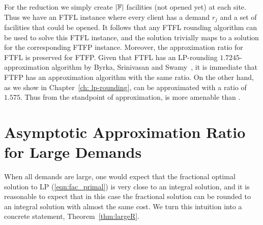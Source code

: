 \documentclass[oneside,final]{ucr}
\begin{document}
For the reduction we simply create $|\mathbb{F}|$ facilities
(not opened yet) at each site. Thus we have an FTFL instance
where every client has a demand $r_j$ and a set of
facilities that could be opened. It follows that any FTFL
rounding algorithm can be used to solve this FTFL instance,
and the solution trivially maps to a solution for the
corresponding FTFP instance. Moreover, the approximation
ratio for FTFL is preserved for FTFP. Given that FTFL has an
LP-rounding $1.7245$-approximation algorithm by Byrka,
Srinivasan and Swamy~\cite{ByrkaSS10}, it is immediate that
FTFP has an approximation algorithm with the same ratio. On
the other hand, as we show in Chapter~\ref{ch: lp-rounding},
{\FTFP} can be approximated with a ratio of $1.575$. Thus
from the standpoint of approximation, {\FTFP} is more
amenable than {\FTFL}.

\section{Asymptotic Approximation Ratio for Large
  Demands}
\label{sec: large_demands}
When all demands are large, one would expect that the
fractional optimal solution to LP (\ref{eqn:fac_primal}) is
very close to an integral solution, and it is reasonable to
expect that in this case the fractional solution can be
rounded to an integral solution with almost the same
cost. We turn this intuition into a concrete statement,
Theorem~\ref{thm:largeR}.
\end{document}
